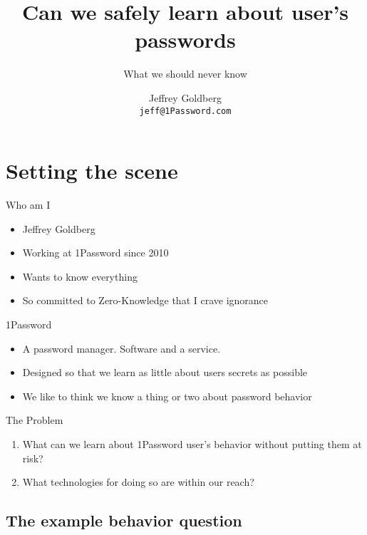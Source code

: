 \documentclass[xcolor={dvipsnames,table,hyperref}]{beamer}
\author[J.~Goldberg]
{Jeffrey Goldberg\texorpdfstring{\\ \texttt{jeff@1Password.com}}{}}
\institute[1Password]{1Password}
\title{Can we safely learn about user's passwords}
\subtitle{What we should never know}
\begin{document}
\maketitle

\section{Setting the scene}

\begin{frame}{Who am I}
  \begin{itemize}
    \item Jeffrey Goldberg
    \item Working at 1Password since 2010
    \item Wants to know everything
    \item So committed to Zero-Knowledge that I crave ignorance
  \end{itemize}

\end{frame}

\begin{frame}{1Password}
  \begin{itemize}
    \item A password manager. Software and a service.
    \item Designed so that we learn as little about users secrets as possible
    \item We like to think we know a thing or two about password behavior
  \end{itemize}
\end{frame}

\begin{frame}{The Problem}
  \begin{enumerate}
    \item What can we learn about 1Password user's behavior without putting them at risk?
    \item What technologies for doing so are within our reach?
  \end{enumerate}
\end{frame}

\subsection{The example behavior question}
\end{document}
